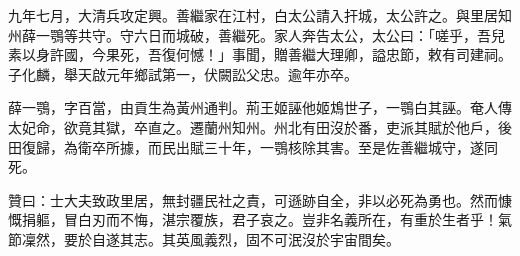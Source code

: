 \begin{pinyinscope}
九年七月，大清兵攻定興。善繼家在江村，白太公請入扞城，太公許之。與里居知州薛一鶚等共守。守六日而城破，善繼死。家人奔告太公，太公曰：「嗟乎，吾兒素以身許國，今果死，吾復何憾！」事聞，贈善繼大理卿，謚忠節，敕有司建祠。子化麟，舉天啟元年鄉試第一，伏闕訟父忠。逾年亦卒。

薛一鶚，字百當，由貢生為黃州通判。荊王姬誣他姬鴆世子，一鶚白其誣。奄人傳太妃命，欲竟其獄，卒直之。遷蘭州知州。州北有田沒於番，吏派其賦於他戶，後田復歸，為衛卒所據，而民出賦三十年，一鶚核除其害。至是佐善繼城守，遂同死。

贊曰：士大夫致政里居，無封疆民社之責，可遜跡自全，非以必死為勇也。然而慷慨捐軀，冒白刃而不悔，湛宗覆族，君子哀之。豈非名義所在，有重於生者乎！氣節凜然，要於自遂其志。其英風義烈，固不可泯沒於宇宙間矣。


\end{pinyinscope}